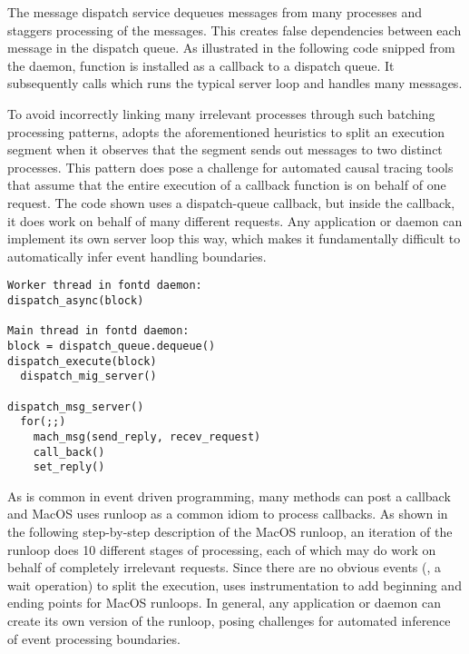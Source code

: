 The message dispatch service dequeues messages from many processes and staggers
processing of the messages. This creates false dependencies between each message
in the dispatch queue. As illustrated in the following code snipped from the
 daemon, function  is installed as a callback to
a dispatch queue. It subsequently calls  which runs
the typical server loop and handles many messages.

To avoid incorrectly linking many irrelevant processes through such batching
processing patterns, \xxx adopts the aforementioned heuristics to split an
execution segment when it observes that the segment sends out messages to two
distinct processes. This pattern does pose a challenge for automated causal
tracing tools that assume that the entire execution of a callback function is
on behalf of one request. The code shown uses a dispatch-queue callback, but
inside the callback, it does work on behalf of many different requests. Any
application or daemon can implement its own server loop this way, which makes it
fundamentally difficult to automatically infer event handling boundaries.

{\footnotesize \begin{verbatim}
Worker thread in fontd daemon:
dispatch_async(block)

Main thread in fontd daemon:
block = dispatch_queue.dequeue()
dispatch_execute(block)
  dispatch_mig_server()

dispatch_msg_server()
  for(;;)
    mach_msg(send_reply, recev_request)
    call_back()
    set_reply()
\end{verbatim}
}

As is common in event driven programming, many methods can post a callback and
MacOS uses runloop as a common idiom to process callbacks. As shown in the
following step-by-step description of the MacOS runloop, an iteration of the
runloop does 10 different stages of processing, each of which may do work on
behalf of completely irrelevant requests. Since there are no obvious events
(\eg, a wait operation) to split the execution, \xxx uses instrumentation to
add beginning and ending points for MacOS runloops. In general, any application
or daemon can create its own version of the runloop, posing challenges for
automated inference of event processing boundaries.


